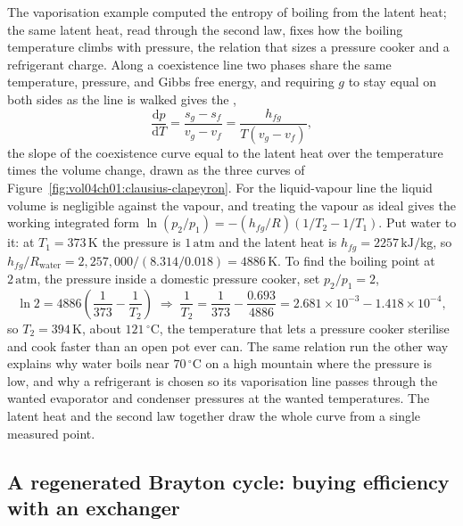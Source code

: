 The vaporisation example computed the entropy of boiling from the latent heat; the
same latent heat, read through the second law, fixes how the boiling temperature
climbs with pressure, the relation that sizes a pressure cooker and a refrigerant
charge. Along a coexistence line two phases share the same temperature, pressure,
and Gibbs free energy, and requiring $g$ to stay equal on both sides as the line is
walked gives the ,
\[
\frac{\mathrm{d}p}{\mathrm{d}T} = \frac{s_g - s_f}{v_g - v_f}
= \frac{h_{fg}}{T(v_g - v_f)},
\]
the slope of the coexistence curve equal to the latent heat over the temperature
times the volume change, drawn as the three curves of
Figure~\ref{fig:vol04ch01:clausius-clapeyron}. For the liquid-vapour line the
liquid volume is negligible against the vapour, and treating the vapour as ideal
gives the working integrated form $\ln(p_2/p_1) = -(h_{fg}/R)(1/T_2 - 1/T_1)$. Put
water to it: at $T_1 = 373\,\si{\kelvin}$ the pressure is $1\,\text{atm}$ and the
latent heat is $h_{fg} = 2257\,\text{kJ}/\text{kg}$, so $h_{fg}/R_{\text{water}} =
2{,}257{,}000/(8.314/0.018) = 4886\,\si{\kelvin}$. To find the boiling point at
$2\,\text{atm}$, the pressure inside a domestic pressure cooker, set $p_2/p_1 = 2$,
\[
\ln 2 = 4886\!\left(\frac{1}{373} - \frac{1}{T_2}\right)
\;\Rightarrow\;
\frac{1}{T_2} = \frac{1}{373} - \frac{0.693}{4886} = 2.681\times10^{-3} -
1.418\times10^{-4},
\]
so $T_2 = 394\,\si{\kelvin}$, about $121\,^{\circ}\mathrm{C}$, the temperature that
lets a pressure cooker sterilise and cook faster than an open pot ever can. The
same relation run the other way explains why water boils near $70\,^{\circ}
\mathrm{C}$ on a high mountain where the pressure is low, and why a refrigerant is
chosen so its vaporisation line passes through the wanted evaporator and condenser
pressures at the wanted temperatures. The latent heat and the second law together
draw the whole curve from a single measured point.



\subsection{A regenerated Brayton cycle: buying efficiency with an exchanger}

